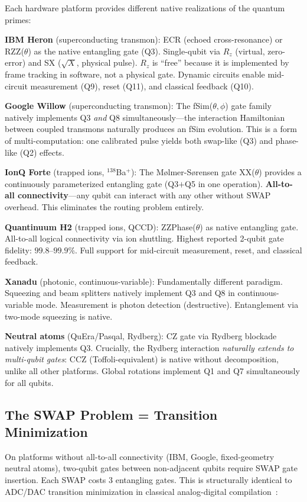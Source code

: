 \documentclass[11pt]{article}
\begin{document}
Each hardware platform provides different native realizations of the quantum primes:

\textbf{IBM Heron} (superconducting transmon): ECR (echoed cross-resonance) or RZZ($\theta$) as the native entangling gate (Q3). Single-qubit via $R_z$ (virtual, zero-error) and SX ($\sqrt{X}$, physical pulse). $R_z$ is ``free'' because it is implemented by frame tracking in software, not a physical gate. Dynamic circuits enable mid-circuit measurement (Q9), reset (Q11), and classical feedback (Q10).

\textbf{Google Willow} (superconducting transmon): The fSim($\theta,\phi$) gate family natively implements Q3 \textit{and} Q8 simultaneously---the interaction Hamiltonian between coupled transmons naturally produces an fSim evolution. This is a form of multi-computation: one calibrated pulse yields both swap-like (Q3) and phase-like (Q2) effects.

\textbf{IonQ Forte} (trapped ions, $^{138}$Ba$^+$): The M\o lmer-S\o rensen gate XX($\theta$) provides a continuously parameterized entangling gate (Q3$+$Q5 in one operation). \textbf{All-to-all connectivity}---any qubit can interact with any other without SWAP overhead. This eliminates the routing problem entirely.

\textbf{Quantinuum H2} (trapped ions, QCCD): ZZPhase($\theta$) as native entangling gate. All-to-all logical connectivity via ion shuttling. Highest reported 2-qubit gate fidelity: $99.8$--$99.9\%$. Full support for mid-circuit measurement, reset, and classical feedback.

\textbf{Xanadu} (photonic, continuous-variable): Fundamentally different paradigm. Squeezing and beam splitters natively implement Q3 and Q8 in continuous-variable mode. Measurement is photon detection (destructive). Entanglement via two-mode squeezing is native.

\textbf{Neutral atoms} (QuEra/Pasqal, Rydberg): CZ gate via Rydberg blockade natively implements Q3. Crucially, the Rydberg interaction \textit{naturally extends to multi-qubit gates}: CCZ (Toffoli-equivalent) is native without decomposition, unlike all other platforms. Global rotations implement Q1 and Q7 simultaneously for all qubits.

\subsection{The SWAP Problem = Transition Minimization}

On platforms without all-to-all connectivity (IBM, Google, fixed-geometry neutral atoms), two-qubit gates between non-adjacent qubits require SWAP gate insertion. Each SWAP costs 3 entangling gates. This is structurally identical to ADC/DAC transition minimization in classical analog-digital compilation~\cite{bieg_primes}:
\end{document}

